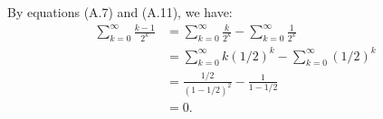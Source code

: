 By equations (A.7) and (A.11), we have:
\begin{align*}
    \sum_{k=0}^\infty\frac{k-1}{2^k} &= \sum_{k=0}^\infty\frac{k}{2^k}-\sum_{k=0}^\infty\frac{1}{2^k} \\
    &= \sum_{k=0}^\infty k(1/2)^k-\sum_{k=0}^\infty(1/2)^k \\
    &= \frac{1/2}{(1-1/2)^2}-\frac{1}{1-1/2} \\
    &= 0.
\end{align*}
